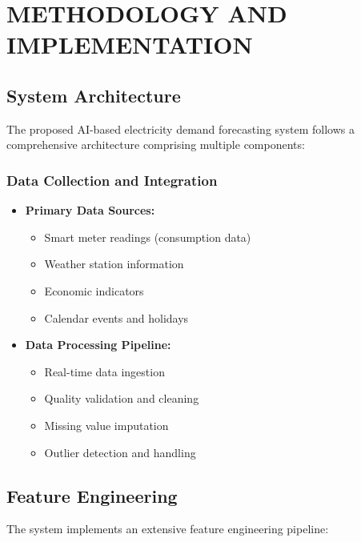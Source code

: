 \documentclass[12pt,a4paper]{report}
\begin{document}
\chapter{METHODOLOGY AND IMPLEMENTATION}
\section{System Architecture}
The proposed AI-based electricity demand forecasting system follows a comprehensive architecture comprising multiple components:

\subsection{Data Collection and Integration}
\begin{itemize}
\item \textbf{Primary Data Sources:}
  \begin{itemize}
    \item Smart meter readings (consumption data)
    \item Weather station information
    \item Economic indicators
    \item Calendar events and holidays
  \end{itemize}
  
\item \textbf{Data Processing Pipeline:}
  \begin{itemize}
    \item Real-time data ingestion
    \item Quality validation and cleaning
    \item Missing value imputation
    \item Outlier detection and handling
  \end{itemize}
\end{itemize}

\section{Feature Engineering}
The system implements an extensive feature engineering pipeline:
\end{document}
